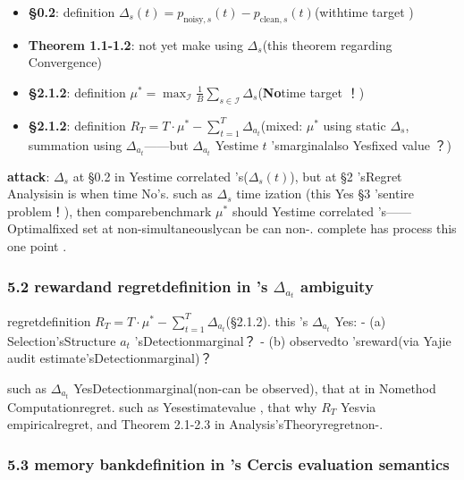 \documentclass[
  12pt,
]{article}
\providecommand{\tightlist}{%
  \setlength{\itemsep}{0pt}\setlength{\parskip}{0pt}}
\begin{document}
\begin{itemize}
\tightlist
\item
  \textbf{§0.2}: definition 
  \(\Delta_s(t) = p_{\text{noisy},s}(t) - p_{\text{clean},s}(t)\)(withtime target )
\item
  \textbf{Theorem 1.1-1.2}: not yet make using  \(\Delta_s\)(this theorem regarding Convergence)
\item
  \textbf{§2.1.2}: definition 
  \(\mu^* = \max_{\mathcal{I}} \frac{1}{B} \sum_{s \in \mathcal{I}} \Delta_s\)(\textbf{No}time target ！)
\item
  \textbf{§2.1.2}: definition 
  \(R_T = T \cdot \mu^* - \sum_{t=1}^{T} \Delta_{a_t}\)(mixed: \(\mu^*\)
  using static  \(\Delta_s\), summation using  \(\Delta_{a_t}\)------but 
  \(\Delta_{a_t}\) Yestime  \(t\) 'smarginalalso Yesfixed value ？)
\end{itemize}

\textbf{attack}: \(\Delta_s\) at  §0.2
in Yestime correlated 's(\(\Delta_s(t)\)), but at  §2
'sRegret Analysisin is when time No's. such as  \(\Delta_s\) time ization (this Yes §3
'sentire problem！), then comparebenchmark \(\mu^*\)
should Yestime correlated 's------Optimalfixed set at non-simultaneouslycan be can non-. complete has process this one point . 

\subsubsection{\texorpdfstring{5.2 rewardand regretdefinition in 's \(\Delta_{a_t}\)
ambiguity}{5.2 rewardand regretdefinition in 's \textbackslash Delta\_\{a\_t\} ambiguity}}\label{ux5956ux52b1ux548cux9057ux61beux5b9aux4e49ux4e2dux7684-delta_a_t-ux6b67ux4e49}

regretdefinition 
\(R_T = T \cdot \mu^* - \sum_{t=1}^{T} \Delta_{a_t}\)(§2.1.2). this 's
\(\Delta_{a_t}\) Yes:  - (a) Selection'sStructure \(a_t\) 'sDetectionmarginal？ - (b)
observedto 'sreward(via Yajie audit estimate'sDetectionmarginal)？

such as  \(\Delta_{a_t}\)
YesDetectionmarginal(non-can be observed), that at in Nomethod Computationregret. such as Yesestimatevalue , that why
\(R_T\) Yesvia empiricalregret, and  Theorem 2.1-2.3 in Analysis'sTheoryregretnon-. 

\subsubsection{5.3 memory bankdefinition in 's Cercis
evaluation semantics}\label{ux8bb0ux5fc6ux5e93ux5b9aux4e49ux4e2dux7684-cercis-ux8bc4ux5206ux8bedux4e49}
\end{document}
